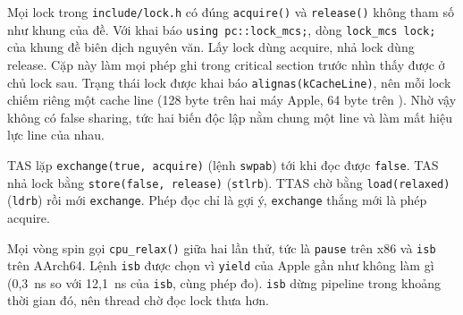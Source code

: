Mọi lock trong \texttt{include/lock.h} có đúng \texttt{acquire()} và \texttt{release()} không tham số như
khung của đề. Với khai báo \texttt{using pc::lock\_mcs;}, dòng \texttt{lock\_mcs lock;} của khung đề
biên dịch nguyên văn. Lấy lock dùng acquire, nhả lock dùng release. Cặp này làm mọi phép ghi trong critical section trước nhìn thấy
được ở chủ lock sau. Trạng thái lock được khai báo \texttt{alignas(kCacheLine)}, nên mỗi lock chiếm riêng
một cache line (128 byte trên hai máy Apple, 64 byte trên ). Nhờ vậy không có false
sharing, tức hai biến độc lập nằm chung một line và làm mất hiệu lực line của nhau.

TAS lặp \texttt{exchange(true, acquire)} (lệnh \texttt{swpab}) tới khi đọc được \texttt{false}. TAS nhả lock bằng
\texttt{store(false, release)} (\texttt{stlrb}). TTAS chờ bằng \texttt{load(relaxed)} (\texttt{ldrb}) rồi
mới \texttt{exchange}. Phép đọc chỉ là gợi ý, \texttt{exchange} thắng mới là phép acquire.

Mọi vòng spin gọi \texttt{cpu\_relax()} giữa hai lần thử, tức là \texttt{pause} trên x86 và \texttt{isb}
trên AArch64. Lệnh \texttt{isb} được chọn vì \texttt{yield} của Apple gần như không làm gì (0,3~ns so với
12,1~ns của \texttt{isb}, cùng phép đo). \texttt{isb} dừng pipeline trong khoảng thời gian đó, nên
thread chờ đọc lock thưa hơn.

